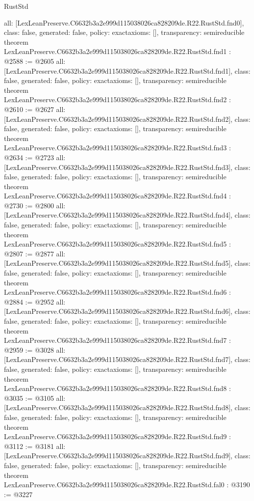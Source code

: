 \begin{lexlean}{RustStd}
\begin{coremodule}
{  all: [LexLeanPreserve.C6632b3a2e999d115038026ca828209de.R22.RustStd.fnd0],
  class: false,
  generated: false,
  policy: exact{axioms: []},
  transparency: semireducible
}
theorem LexLeanPreserve.C6632b3a2e999d115038026ca828209de.R22.RustStd.fnd1 : @2588 := @2605 {
  all: [LexLeanPreserve.C6632b3a2e999d115038026ca828209de.R22.RustStd.fnd1],
  class: false,
  generated: false,
  policy: exact{axioms: []},
  transparency: semireducible
}
theorem LexLeanPreserve.C6632b3a2e999d115038026ca828209de.R22.RustStd.fnd2 : @2610 := @2627 {
  all: [LexLeanPreserve.C6632b3a2e999d115038026ca828209de.R22.RustStd.fnd2],
  class: false,
  generated: false,
  policy: exact{axioms: []},
  transparency: semireducible
}
theorem LexLeanPreserve.C6632b3a2e999d115038026ca828209de.R22.RustStd.fnd3 : @2634 := @2723 {
  all: [LexLeanPreserve.C6632b3a2e999d115038026ca828209de.R22.RustStd.fnd3],
  class: false,
  generated: false,
  policy: exact{axioms: []},
  transparency: semireducible
}
theorem LexLeanPreserve.C6632b3a2e999d115038026ca828209de.R22.RustStd.fnd4 : @2730 := @2800 {
  all: [LexLeanPreserve.C6632b3a2e999d115038026ca828209de.R22.RustStd.fnd4],
  class: false,
  generated: false,
  policy: exact{axioms: []},
  transparency: semireducible
}
theorem LexLeanPreserve.C6632b3a2e999d115038026ca828209de.R22.RustStd.fnd5 : @2807 := @2877 {
  all: [LexLeanPreserve.C6632b3a2e999d115038026ca828209de.R22.RustStd.fnd5],
  class: false,
  generated: false,
  policy: exact{axioms: []},
  transparency: semireducible
}
theorem LexLeanPreserve.C6632b3a2e999d115038026ca828209de.R22.RustStd.fnd6 : @2884 := @2952 {
  all: [LexLeanPreserve.C6632b3a2e999d115038026ca828209de.R22.RustStd.fnd6],
  class: false,
  generated: false,
  policy: exact{axioms: []},
  transparency: semireducible
}
theorem LexLeanPreserve.C6632b3a2e999d115038026ca828209de.R22.RustStd.fnd7 : @2959 := @3028 {
  all: [LexLeanPreserve.C6632b3a2e999d115038026ca828209de.R22.RustStd.fnd7],
  class: false,
  generated: false,
  policy: exact{axioms: []},
  transparency: semireducible
}
theorem LexLeanPreserve.C6632b3a2e999d115038026ca828209de.R22.RustStd.fnd8 : @3035 := @3105 {
  all: [LexLeanPreserve.C6632b3a2e999d115038026ca828209de.R22.RustStd.fnd8],
  class: false,
  generated: false,
  policy: exact{axioms: []},
  transparency: semireducible
}
theorem LexLeanPreserve.C6632b3a2e999d115038026ca828209de.R22.RustStd.fnd9 : @3112 := @3181 {
  all: [LexLeanPreserve.C6632b3a2e999d115038026ca828209de.R22.RustStd.fnd9],
  class: false,
  generated: false,
  policy: exact{axioms: []},
  transparency: semireducible
}
theorem LexLeanPreserve.C6632b3a2e999d115038026ca828209de.R22.RustStd.fal0 : @3190 := @3227 {
}
\end{coremodule}
\end{lexlean}
